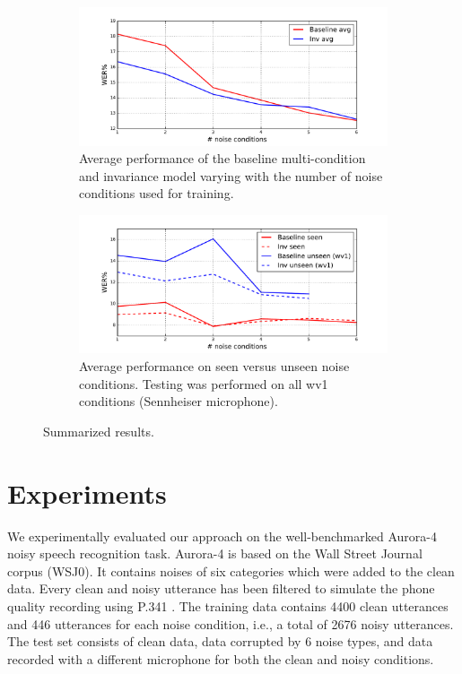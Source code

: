 \documentclass[a4paper]{article}
\begin{document}
\begin{figure}[t]
    \begin{subfigure}[b]{\linewidth}
        \centering
        \includegraphics[width=1.1\linewidth]{wer_avg.pdf}
        \caption{Average performance of the baseline multi-condition and invariance model varying with  the number of noise
            conditions used for training.}
        \label{fig:results}
    \end{subfigure}
    \begin{subfigure}[b]{\linewidth}
        \centering
        \includegraphics[width=1.1\linewidth]{wer_seen_unseen.pdf}
        \caption{Average performance on seen versus unseen noise conditions.
            Testing was performed on all wv1 conditions (Sennheiser microphone).
            }
    \end{subfigure}
    \caption{Summarized results.}
    \label{fig:results}
\end{figure}

\section{Experiments}
\label{sec:experiments}
We experimentally evaluated our approach   
on the well-benchmarked Aurora-4 \cite{parihar2002aurora} noisy speech recognition task. Aurora-4
is based on the Wall Street Journal corpus (WSJ0). It contains noises of 
six categories which were added to the clean data. Every clean and noisy
utterance has been 
filtered to simulate the phone quality recording using P.341 \cite{pariharsignal}. The training
data contains 4400 clean utterances and 446 utterances for each noise condition,
i.e., a total of 2676 noisy utterances.
The test set consists of clean data, data corrupted by 6 noise types, and data 
recorded with a different microphone for both the clean and noisy conditions.
\end{document}
